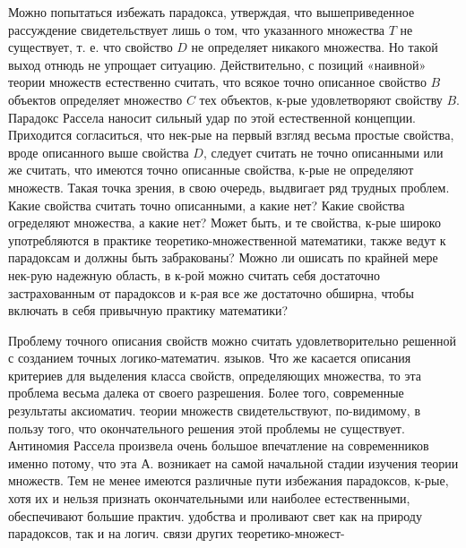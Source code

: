 \documentclass[10pt]{article}
\begin{document}
Можно попытаться избежать парадокса, утверждая, что вышеприведенное рассуждение свидетельствует лишь о том, что указанного множества $T$ не существует, т. е. что свойство $D$ не определяет никакого множества. Но такой выход отнюдь не упрощает ситуацию. Действительно, с позиций «наивной» теории множеств естественно считать, что всякое точно описанное свойство $B$ объектов определяет множество $C$ тех объектов, к-рые удовлетворяют свойству $B$. Парадокс Рассела наносит сильный удар по этой естественной концепции. Приходится согласиться, что нек-рые на первый взгляд весьма простые свойства, вроде описанного выше свойства $D$, следует считать не точно описанными или же считать, что имеются точно описанные свойства, к-рые не определяют множеств. Такая точка зрения, в свою очередь, выдвигает ряд трудных проблем. Какие свойства считать точно описанными, а какие нет? Какие свойства огределяют множества, а какие нет? Может быть, и те свойства, к-рые широко употребляются в практике теоретико-множественной математики, также ведут к парадоксам и должны быть забракованы? Можно ли ошисать по крайней мере нек-рую надежную область, в к-рой можно считать себя достаточно застрахованным от парадоксов и к-рая все же достаточно обширна, чтобы включать в себя привычную практику математики?



Проблему точного описания свойств можно считать удовлетворительно решенной с созданием точных логико-математич. языков. Что же касается описания критериев для выделения класса свойств, определяющих множества, то эта проблема весьма далека от своего разрешения. Более того, современные результаты аксиоматич. теории множеств свидетельствуют, по-видимому, в пользу того, что окончательного решения этой проблемы не существует. Антиномия Рассела произвела очень большое впечатление на современников именно потому, что эта А. возникает на самой начальной стадии изучения теории множеств. Тем не менее имеются различные пути избежания парадоксов, к-рые, хотя их и нельзя признать окончательными или наиболее естественными, обеспечивают большие практич. удобства и проливают свет как на природу парадоксов, так и на логич. связи других теоретико-множест-
\end{document}
